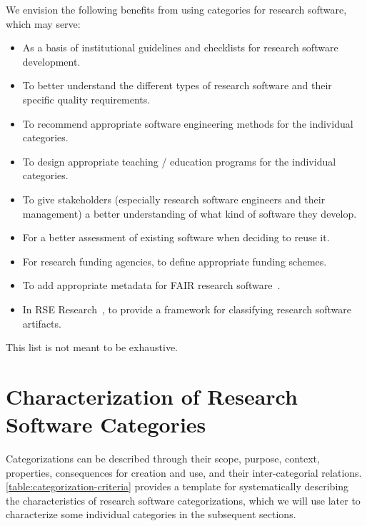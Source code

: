 \documentclass{IEEEcsmag}
\newcommand{\ieeeitem}{\item[{\ieeeguilsinglright}]}
\begin{document}
We envision the following benefits from using categories for research software, which may serve:
    \begin{itemize}
        \ieeeitem As a basis of institutional guidelines and checklists for research software development.
        \ieeeitem To better understand the different types of research software and their specific quality requirements.
        \ieeeitem To recommend appropriate software engineering methods for the individual categories.
        \ieeeitem To design appropriate teaching / education programs for the individual categories.
        \ieeeitem To give stakeholders (especially research software engineers and their management) a better understanding of what kind of software they develop.
        \ieeeitem For a better assessment of existing software when deciding to reuse it.
        \ieeeitem For research funding agencies, to define appropriate funding schemes.
        \ieeeitem To add appropriate metadata for FAIR research software~\cite{Lamprecht2020,FAIR_Software_2020}.
        \ieeeitem In RSE Research~\cite{RSER2023}, to provide a framework for classifying research software artifacts.
    \end{itemize}
This list is not meant to be exhaustive.



\section{Characterization of Research Software Categories}

Categorizations can be described through their scope, purpose, context, properties, consequences for creation and use, and their inter-categorial relations. \autoref{table:categorization-criteria} provides a template for systematically describing the characteristics of research software categorizations, which we will use later to characterize some individual categories in the subsequent sections.
\end{document}
